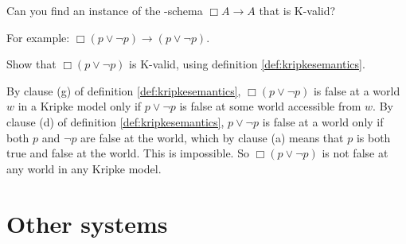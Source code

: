 \begin{exercise}
  Can you find an instance of the -schema $\Box A \to A$ that is K-valid?
\end{exercise}
\begin{solution}
  For example: $\Box(p \lor \neg p) \to (p \lor \neg p)$.
\end{solution}

\begin{exercise}
  Show that $\Box(p \lor \neg p)$ is K-valid, using definition
  \ref{def:kripkesemantics}.
\end{exercise}
\begin{solution}
  By clause (g) of definition \ref{def:kripkesemantics}, $\Box(p \lor \neg p)$
  is false at a world $w$ in a Kripke model only if $p \lor \neg p$ is false at
  some world accessible from $w$. By clause (d) of definition
  \ref{def:kripkesemantics}, $p \lor \neg p$ is false at a world only if both
  $p$ and $\neg p$ are false at the world, which by clause (a) means that $p$ is
  both true and false at the world. This is impossible. So $\Box(p \lor \neg p)$
  is not false at any world in any Kripke model.
\end{solution}

  


\section{Other systems}\label{sec:normalsystems}

